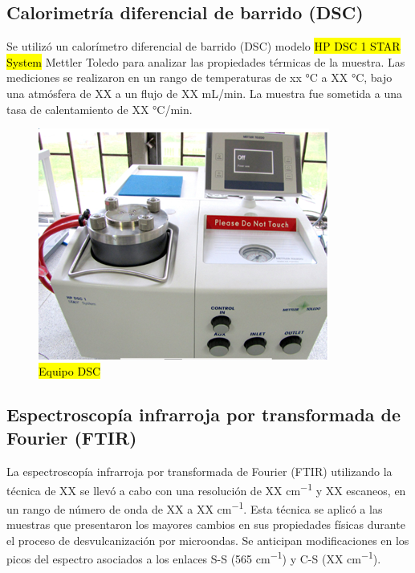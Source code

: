 \begin{multicols}{2}
\subsection{Calorimetría diferencial de barrido (DSC) }
Se utilizó un calorímetro diferencial de barrido (DSC) modelo \hl{HP DSC 1 STAR System} Mettler Toledo para analizar las propiedades térmicas de la muestra. Las mediciones se realizaron en un rango de temperaturas de xx °C a XX °C, bajo una atmósfera de XX a un flujo de XX mL/min. La muestra fue sometida a una tasa de calentamiento de XX °C/min. %

\begin{figure}[H]
    \centering
\includegraphics[scale=0.6]{00Figuras/DSC.png}
    \caption{\hl{Equipo DSC}}
    \label{DSC}
\end{figure}

\subsection{Espectroscopía infrarroja por transformada de Fourier (FTIR)}

La espectroscopía infrarroja por transformada de Fourier (FTIR) utilizando la técnica de XX se llevó a cabo con una resolución de XX \unit{cm^{-1}} y XX escaneos, en un rango de número de onda de XX a XX \unit{cm^{-1}}. Esta técnica se aplicó a las muestras que presentaron los mayores cambios en sus propiedades físicas durante el proceso de desvulcanización por microondas. Se anticipan modificaciones en los picos del espectro asociados a los enlaces S-S (565 \unit{cm^{-1}}) y C-S (XX \unit{cm^{-1}}).  



\end{multicols}
